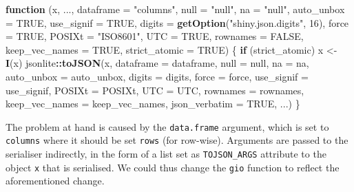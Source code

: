 \documentclass[
  10pt,
]{krantz}
\makeatletter
\newenvironment{Shaded}{\begin{snugshade}}{\end{snugshade}}
\newcommand{\ControlFlowTok}[1]{\textcolor[rgb]{0.27,0.27,0.27}{\textbf{#1}}}
\newcommand{\DataTypeTok}[1]{\textcolor[rgb]{0.27,0.27,0.27}{#1}}
\newcommand{\DecValTok}[1]{\textcolor[rgb]{0.06,0.06,0.06}{#1}}
\newcommand{\KeywordTok}[1]{\textcolor[rgb]{0.27,0.27,0.27}{\textbf{#1}}}
\newcommand{\NormalTok}[1]{#1}
\newcommand{\OperatorTok}[1]{\textcolor[rgb]{0.43,0.43,0.43}{\textbf{#1}}}
\newcommand{\OtherTok}[1]{\textcolor[rgb]{0.37,0.37,0.37}{#1}}
\newcommand{\StringTok}[1]{\textcolor[rgb]{0.5,0.5,0.5}{#1}}
\newenvironment{kframe}{%
\medskip{}
\setlength{\fboxsep}{.8em}
 \def\at@end@of@kframe{}%
 \ifinner\ifhmode%
  \def\at@end@of@kframe{\end{minipage}}%
  \begin{minipage}{\columnwidth}%
 \fi\fi%
 \def\FrameCommand##1{\hskip\@totalleftmargin \hskip-\fboxsep
 \colorbox{shadecolor}{##1}\hskip-\fboxsep
     \hskip-\linewidth \hskip-\@totalleftmargin \hskip\columnwidth}%
 \MakeFramed {\advance\hsize-\width
   \@totalleftmargin\z@ \linewidth\hsize
   \@setminipage}}%
 {\par\unskip\endMakeFramed%
 \at@end@of@kframe}
\renewenvironment{Shaded}{\begin{kframe}}{\end{kframe}}
\makeatother
\begin{document}
\begin{Shaded}
\begin{Highlighting}[]
\ControlFlowTok{function}\NormalTok{ (x, ..., }\DataTypeTok{dataframe =} \StringTok{"columns"}\NormalTok{, }\DataTypeTok{null =} \StringTok{"null"}\NormalTok{, }
\DataTypeTok{na =} \StringTok{"null"}\NormalTok{, }\DataTypeTok{auto\_unbox =} \OtherTok{TRUE}\NormalTok{, }\DataTypeTok{use\_signif =} \OtherTok{TRUE}\NormalTok{, }
  \DataTypeTok{digits =} \KeywordTok{getOption}\NormalTok{(}\StringTok{"shiny.json.digits"}\NormalTok{, }\DecValTok{16}\NormalTok{), }\DataTypeTok{force =} \OtherTok{TRUE}\NormalTok{,}
  \DataTypeTok{POSIXt =} \StringTok{"ISO8601"}\NormalTok{, }\DataTypeTok{UTC =} \OtherTok{TRUE}\NormalTok{, }\DataTypeTok{rownames =} \OtherTok{FALSE}\NormalTok{, }
  \DataTypeTok{keep\_vec\_names =} \OtherTok{TRUE}\NormalTok{, }\DataTypeTok{strict\_atomic =} \OtherTok{TRUE}\NormalTok{) }
\NormalTok{\{}
  \ControlFlowTok{if}\NormalTok{ (strict\_atomic) }
\NormalTok{      x <{-}}\StringTok{ }\KeywordTok{I}\NormalTok{(x)}
\NormalTok{  jsonlite}\OperatorTok{::}\KeywordTok{toJSON}\NormalTok{(x, }\DataTypeTok{dataframe =}\NormalTok{ dataframe, }\DataTypeTok{null =}\NormalTok{ null, }\DataTypeTok{na =}\NormalTok{ na, }
    \DataTypeTok{auto\_unbox =}\NormalTok{ auto\_unbox, }\DataTypeTok{digits =}\NormalTok{ digits, }\DataTypeTok{force =}\NormalTok{ force, }
    \DataTypeTok{use\_signif =}\NormalTok{ use\_signif, }\DataTypeTok{POSIXt =}\NormalTok{ POSIXt, }\DataTypeTok{UTC =}\NormalTok{ UTC, }
    \DataTypeTok{rownames =}\NormalTok{ rownames, }\DataTypeTok{keep\_vec\_names =}\NormalTok{ keep\_vec\_names, }
    \DataTypeTok{json\_verbatim =} \OtherTok{TRUE}\NormalTok{, ...)}
\NormalTok{\}}
\end{Highlighting}
\end{Shaded}

The problem at hand is caused by the \texttt{data.frame} argument, which is set to \texttt{columns} where it should be set \texttt{rows} (for row-wise). Arguments are passed to the serialiser indirectly, in the form of a list set as \texttt{TOJSON\_ARGS} attribute to the object \texttt{x} that is serialised. We could thus change the \texttt{gio} function to reflect the aforementioned change.
\end{document}
